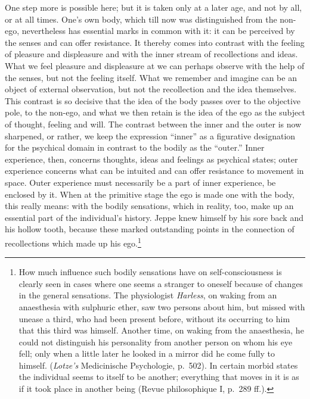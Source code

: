 \documentclass[12pt,a4paper]{book}
\newcommand{\opage}[1]{\marginnote{\footnotesize\textit{[#1]}}}
\begin{document}
One step more is possible here; but it is taken only at a later age, and
not by all, or at all times. One's own body, which till now was
distinguished from the non-ego, nevertheless has essential marks in
common with it: it can be perceived by the senses and can offer
resistance. It thereby comes into contrast with the feeling of pleasure
and displeasure and with the inner stream of recollections and ideas.
What we feel pleasure and displeasure at we can perhaps observe with the
help of the senses, but not the feeling itself. What we remember and
imagine can be an object of external observation, but not the
recollection and the idea themselves.
\opage{7}This contrast is so decisive that the idea of the body passes
over to the objective pole, to the non-ego, and what we then retain is
the idea of the ego as the subject of thought, feeling and will. The
contrast between the inner and the outer is now sharpened, or rather, we
keep the expression ``inner'' as a figurative designation for the
psychical domain in contrast to the bodily as the ``outer.'' Inner
experience, then, concerns thoughts, ideas and feelings as psychical
states; outer experience concerns what can be intuited and can offer
resistance to movement in space. Outer experience must necessarily be a
part of inner experience, be enclosed by it. When at the primitive stage
the ego is made one with the body, this really means: with the bodily
sensations, which in reality, too, make up an essential part of the
individual's history. Jeppe knew himself by his sore back and his hollow
tooth, because these marked outstanding points in the connection of
recollections which made up his ego.\footnote{How much influence such
bodily sensations have on self-consciousness is clearly seen in cases
where one seems a stranger to oneself because of changes in the general
sensations. The physiologist \emph{Harless}, on waking from an
anaesthesia with sulphuric ether, saw two persons about him, but missed
with unease a third, who had been present before, without its occurring
to him that this third was himself. Another time, on waking from the
anaesthesia, he could not distinguish his personality from another
person on whom his eye fell; only when a little later he looked in a
mirror did he come fully to himself. (\emph{Lotze's} Medicinische
Psychologie, p.~502). In certain morbid states the individual seems to
itself to be another; everything that moves in it is as if it took place
in another being (Revue philosophique I, p.~289 ff.).}
\end{document}
